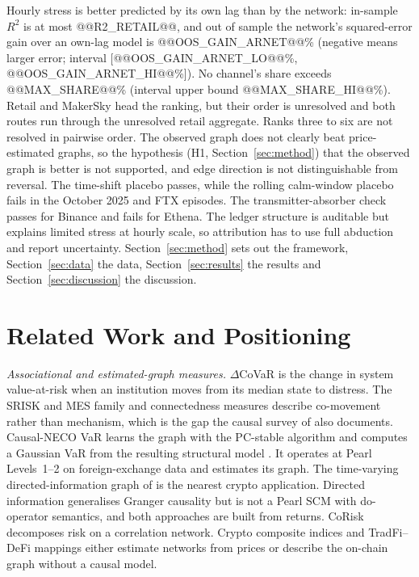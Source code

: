 \documentclass[referee,pdflatex,sn-mathphys-ay]{sn-jnl}
\theoremstyle{thmstyleone}%
\theoremstyle{thmstyletwo}%
\theoremstyle{thmstylethree}%
\begin{document}
Hourly stress is better predicted by its own lag than by the network: in-sample $R^2$ is at most
@@R2_RETAIL@@, and out of sample the network's squared-error gain over an
own-lag model is @@OOS_GAIN_ARNET@@\% (negative means larger error; interval [@@OOS_GAIN_ARNET_LO@@\%, @@OOS_GAIN_ARNET_HI@@\%]). No channel's share
exceeds @@MAX_SHARE@@\% (interval upper bound @@MAX_SHARE_HI@@\%). Retail and MakerSky head the ranking, but
their order is unresolved and both routes run through the unresolved retail aggregate. Ranks three to six
are not resolved in pairwise order. The observed graph does not clearly beat price-estimated graphs, so the hypothesis (H1, Section~\ref{sec:method}) that the observed graph is better is
not supported, and edge direction is not distinguishable from reversal. The time-shift placebo passes, while the
rolling calm-window placebo fails in the October 2025 and FTX episodes. The transmitter-absorber check passes for
Binance and fails for Ethena. The ledger structure is auditable but explains limited stress at hourly scale, so
attribution has to use full abduction and report uncertainty. Section~\ref{sec:method} sets out the framework,
Section~\ref{sec:data} the data, Section~\ref{sec:results} the results and Section~\ref{sec:discussion} the discussion.

\section{Related Work and Positioning}
\label{sec:related}

\emph{Associational and estimated-graph measures.} $\Delta$CoVaR \citep{adrian2016covar} is the change in
system value-at-risk when an institution moves from its median state to distress. The
SRISK and MES family \citep{acharya2017measuring} and connectedness measures
\citep{diebold2014network,billio2012econometric} describe co-movement rather than mechanism, which is the gap the causal
survey of \citet{kumar2025causalreview} also documents. Causal-NECO VaR \citep{rigana2024neco} learns the graph
with the PC-stable algorithm \citep{colombo2014order} and computes a Gaussian VaR from the
resulting structural model \citep{rigana2023new,spirtes2000causation}. It operates at
Pearl Levels~1--2 on foreign-exchange data and estimates its graph. The time-varying
directed-information graph of \citet{etesami2023tvdig} is the nearest crypto application. Directed information
generalises Granger causality \citep{granger1969} but is not a Pearl SCM with do-operator semantics, and both approaches are
built from returns. CoRisk \citep{giudici2018corisk} decomposes risk on a correlation network. Crypto composite
indices \citep{farzulla2026asri} and TradFi--DeFi mappings \citep{aufiero2025mapping} either estimate networks from prices or
describe the on-chain graph without a causal model.
\end{document}

